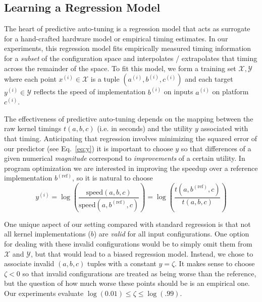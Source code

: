 \documentclass{sig-alternate}
\begin{document}
\subsection{Learning a Regression Model}

The heart of predictive auto-tuning is a regression model that acts as surrogate
for a hand-crafted hardware model or empirical timing estimates.
In our experiments, this regression model fits empirically measured timing information for a {\em subset} of the configuration space and interpolates / extrapolates that timing across the remainder of the space.
To fit this model, we
form a training set $\mathcal{X}, \mathcal{Y}$ where
each point $x^{(i)} \in \mathcal{X}$ is a tuple $(a^{(i)}, b^{(i)}, c^{(i)})$
and each target $y^{(i)} \in \mathcal{Y}$  reflects the speed of implementation $b^{(i)}$
on inputs $a^{(i)}$ on platform $c^{(i)}$.

The effectiveness of predictive auto-tuning depends on the mapping between the raw kernel timings $t(a, b, c)$ (i.e. in seconds) and the utility $y$ associated with that timing.
Anticipating that regression involves minimizing the squared error of our predictor (see Eq.~\ref{eq:y}) it is important to choose $y$ so that differences of a given numerical {\em magnitude} correspond to {\em improvements} of a certain utility.
In program optimization we are interested in improving the speedup over a reference implementation $b^{(\mathrm{ref})}$, so it is natural to choose
\begin{equation}
y^{(i)}
= \log\left(\frac{\mathrm{speed}(a, b, c)}{\mathrm{speed}(a, b^{(\mathrm{ref})}, c)} \right)
= \log\left(\frac{t(a, b^{(\mathrm{ref})}, c)}{t(a, b, c)} \right)
\label{eq:y}
\end{equation}

One unique aspect of our setting compared with standard regression
is that not all kernel implementations ($b$) are {\em valid}
for all input configurations. One option for dealing with these invalid configurations
would be to simply omit them from $\mathcal{X}$ and $\mathcal{Y}$, but that would lead to a biased regression model.
Instead, we chose to associate invalid $(a, b, c)$ tuples with a constant $y = \zeta$.
It makes sense to choose $\zeta < 0$ so that invalid configurations are treated as being worse than the reference,
but the question of how much worse these points should be is an empirical one.
Our experiments evaluate $\log(0.01) \leq \zeta \leq \log(.99)$.

\end{document}
